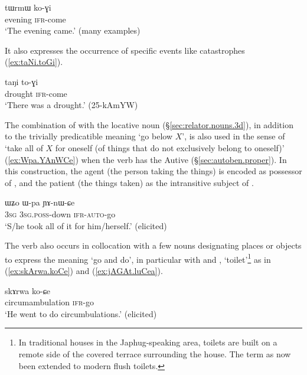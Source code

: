\begin{exe}
\ex \label{ex:tWrmW.koGi}
\gll tɯrmɯ ko-ɣi  \\
evening \textsc{ifr}-come \\
\glt `The evening came.' (many examples)
\end{exe}

It also expresses the occurrence of  specific events like catastrophes (\ref{ex:taNi.toGi}).

\begin{exe}
\ex \label{ex:taNi.toGi}
\gll taŋi to-ɣi \\
drought \textsc{ifr}-come \\
\glt `There was a drought.' (25-kAmYW)
\end{exe}

The combination of  with the locative noun  (§\ref{sec:relator.nouns.3d}), in addition to the trivially predicatible meaning `go below $X$', is also used in the sense of `take all of $X$ for oneself (of things that do not exclusively belong to oneself)' (\ref{ex:Wpa.YAnWCe}) when the verb has the Autive  (§\ref{sec:autoben.proper}). In this construction, the agent (the person taking the things) is encoded as possessor of , and the patient (the things taken) as the intransitive subject of .


\begin{exe}
\ex \label{ex:Wpa.YAnWCe}
\gll ɯʑo ɯ-pa ɲɤ-nɯ-ɕe \\
\textsc{3sg} \textsc{3sg}.\textsc{poss}-down \textsc{ifr}-\textsc{auto}-go \\
\glt `S/he took all of it for him/herself.' (elicited)
\end{exe}

The verb  also occurs in collocation with a few nouns designating places or objects to express the meaning `go and do', in particular with  and , `toilet'\footnote{In traditional houses in the Japhug-speaking area, toilets are built on a remote side of the covered terrace surrounding the house. The term as now been extended to modern flush toilets.} as in (\ref{ex:skArwa.koCe}) and (\ref{ex:jAGAt.luCea}).

 \begin{exe}
	\ex \label{ex:skArwa.koCe}
	\gll skɤrwa ko-ɕe \\
	circumambulation \textsc{ifr}-go \\
	\glt `He went to do circumbulations.' (elicited)
\end{exe}

